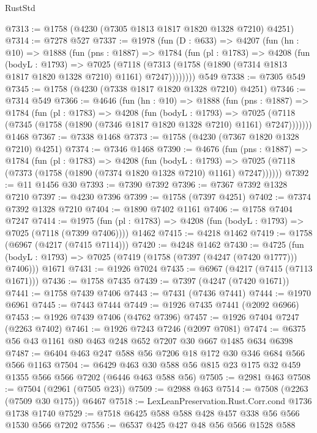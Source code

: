 \begin{lexlean}{RustStd}
\begin{coremodule}
@7313 := @1758 (@4230 (@7305 @1813 @1817 @1820 @1328 @7210) @4251)
@7314 := @7278 @527
@7337 := @1978
    (fun (D : @633) =>
    @4207
      (fun (hn : @10) =>
      @1888
        (fun (pns : @1887) =>
        @1784
          (fun (pl : @1783) =>
          @4208
            (fun (bodyL : @1793) =>
            @7025
              (@7118 (@7313 (@1758 (@1890 (@7314 @1813 @1817 @1820 @1328 @7210) @1161) @7247))))))))
    @549
@7338 := @7305 @549
@7345 := @1758 (@4230 (@7338 @1817 @1820 @1328 @7210) @4251)
@7346 := @7314 @549
@7366 := @4646
    (fun (hn : @10) =>
    @1888
      (fun (pns : @1887) =>
      @1784
        (fun (pl : @1783) =>
        @4208
          (fun (bodyL : @1793) =>
          @7025 (@7118 (@7345 (@1758 (@1890 (@7346 @1817 @1820 @1328 @7210) @1161) @7247)))))))
    @1468
@7367 := @7338 @1468
@7373 := @1758 (@4230 (@7367 @1820 @1328 @7210) @4251)
@7374 := @7346 @1468
@7390 := @4676
    (fun (pns : @1887) =>
    @1784
      (fun (pl : @1783) =>
      @4208
        (fun (bodyL : @1793) =>
        @7025 (@7118 (@7373 (@1758 (@1890 (@7374 @1820 @1328 @7210) @1161) @7247))))))
@7392 := @11 @1456 @30
@7393 := @7390 @7392
@7396 := @7367 @7392 @1328 @7210
@7397 := @4230 @7396
@7399 := @1758 (@7397 @4251)
@7402 := @7374 @7392 @1328 @7210
@7404 := @1890 @7402 @1161
@7406 := @1758 @7404 @7247
@7414 := @1975
    (fun (pl : @1783) => @4208 (fun (bodyL : @1793) => @7025 (@7118 (@7399 @7406))))
    @1462
@7415 := @4218 @1462
@7419 := @1758 (@6967 (@4217 (@7415 @7114)))
@7420 := @4248 @1462
@7430 := @4725
    (fun (bodyL : @1793) => @7025 (@7419 (@1758 (@7397 (@4247 (@7420 @1777))) @7406)))
    @1671
@7431 := @1926 @7024
@7435 := @6967 (@4217 (@7415 (@7113 @1671)))
@7436 := @1758 @7435
@7439 := @7397 (@4247 (@7420 @1671))
@7441 := @1758 @7439 @7406
@7443 := @7431 (@7436 @7441)
@7444 := @1970 @6961
@7445 := @7443 @7444
@7449 := @1926 @7435 @7441 (@2092 @6966)
@7453 := @1926 @7439 @7406 (@4762 @7396)
@7457 := @1926 @7404 @7247 (@2263 @7402)
@7461 := @1926 @7243 @7246 (@2097 @7081)
@7474 := @6375 @56 @43 @1161 @80 @463 @248 @652 @7207 @30 @667 @1485 @634 @6398
@7487 := @6404 @463 @247 @588 @56 @7206 @18 @172 @30 @346 @684 @566 @566 @1163
@7504 := @6429 @463 @30 @588 @56 @815 @23 @175 @32 @459 @1355 @566 @566 @7202 (@6446 @463 @588 @56)
@7505 := @2981 @463
@7508 := @7504 (@2961 (@7505 @23))
@7509 := @2988 @463
@7514 := @7508 (@2263 (@7509 @30 @175)) @6467
@7518 := LexLeanPreservation.Rust.Corr.cond @1736 @1738 @1740
@7529 := @7518 @6425 @588 @588 @428 @457 @338 @56 @566 @1530 @566 @7202
@7556 := @6537
    @425
    @427
    @48
    @56
    @566
    @1528
    @588

\end{coremodule}
\end{lexlean}
